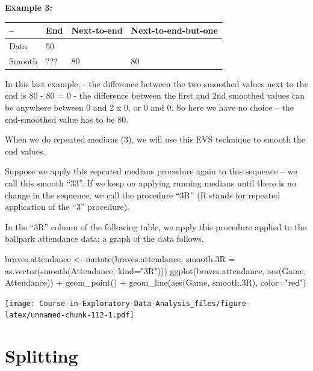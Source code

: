 \documentclass[
]{book}
\newenvironment{Shaded}{\begin{snugshade}}{\end{snugshade}}
\newcommand{\AttributeTok}[1]{\textcolor[rgb]{0.77,0.63,0.00}{#1}}
\newcommand{\FloatTok}[1]{\textcolor[rgb]{0.00,0.00,0.81}{#1}}
\newcommand{\FunctionTok}[1]{\textcolor[rgb]{0.00,0.00,0.00}{#1}}
\newcommand{\NormalTok}[1]{#1}
\newcommand{\OtherTok}[1]{\textcolor[rgb]{0.56,0.35,0.01}{#1}}
\newcommand{\SpecialCharTok}[1]{\textcolor[rgb]{0.00,0.00,0.00}{#1}}
\newcommand{\StringTok}[1]{\textcolor[rgb]{0.31,0.60,0.02}{#1}}
\begin{document}
\textbf{Example 3:}

\begin{longtable}[]{@{}llll@{}}
\toprule
-- & End & Next-to-end & Next-to-end-but-one \\
\midrule
\endhead
Data & 50 & & \\
Smooth & ??? & 80 & 80 \\
\bottomrule
\end{longtable}

In this last example,
- the difference between the two smoothed values next to the end is 80 - 80 = 0
- the difference between the first and 2nd smoothed values can be anywhere between 0 and 2 x 0, or 0 and 0. So here we have no choice -- the end-smoothed value has to be 80.

When we do repeated medians (3), we will use this EVS technique to smooth the end values.

Suppose we apply this repeated medians procedure again to this sequence -- we call this smooth ``33''. If we keep on applying running medians until there is no change in the sequence, we call the procedure ``3R'' (R stands for repeated application of the ``3'' procedure).

In the ``3R'' column of the following table, we apply this procedure applied to the ballpark attendance data; a graph of the data follows.

\begin{Shaded}
\begin{Highlighting}[]
\NormalTok{braves.attendance }\OtherTok{\textless{}{-}} \FunctionTok{mutate}\NormalTok{(braves.attendance,}
            \AttributeTok{smooth.3R =} \FunctionTok{as.vector}\NormalTok{(}\FunctionTok{smooth}\NormalTok{(Attendance, }\AttributeTok{kind=}\StringTok{"3R"}\NormalTok{)))}
\FunctionTok{ggplot}\NormalTok{(braves.attendance,}
       \FunctionTok{aes}\NormalTok{(Game, Attendance)) }\SpecialCharTok{+}
  \FunctionTok{geom\_point}\NormalTok{() }\SpecialCharTok{+}
  \FunctionTok{geom\_line}\NormalTok{(}\FunctionTok{aes}\NormalTok{(Game, smooth}\FloatTok{.3}\NormalTok{R), }\AttributeTok{color=}\StringTok{"red"}\NormalTok{)}
\end{Highlighting}
\end{Shaded}

\texttt{[image: Course-in-Exploratory-Data-Analysis\_files/figure-latex/unnamed-chunk-112-1.pdf]}

\hypertarget{splitting}{%
\section{Splitting}\label{splitting}}
\end{document}
